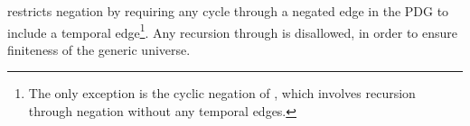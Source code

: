 \vspace{1em}
\lang restricts negation by requiring any cycle through a negated edge in the PDG to include a temporal edge\footnote{The only exception is the cyclic negation of , which involves recursion through negation without any temporal edges.}.  Any recursion through  is disallowed, in order to ensure finiteness of the generic universe.  




%

